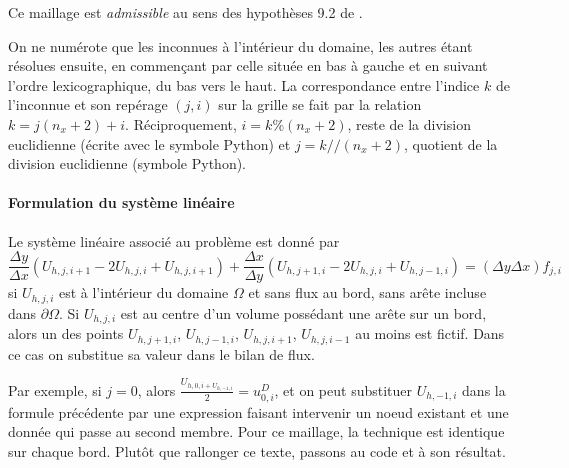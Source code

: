 \newpage

Ce maillage est \textit{admissible} au sens des hypothèses 9.2 de \cite{eymard:hal-02100732}. 

On ne numérote que les inconnues à l'intérieur du domaine, les autres étant résolues ensuite, en commençant par celle située en bas à gauche et en suivant l'ordre lexicographique, du bas vers le haut. La correspondance entre l'indice $k$ de l'inconnue et son repérage $(j,i)$ sur la grille se fait par la relation $k = j(n_x+2) + i$. Réciproquement, $i = k \% (n_x+2)$, reste de la division euclidienne (écrite avec le symbole Python) et $j = k // (n_x+2)$, quotient de la division euclidienne (symbole Python).

\paragraph{Formulation du système linéaire} Le système linéaire associé au problème est donné par
\begin{equation*}
    \frac{\Delta y}{\Delta x} \left( U_{h, j, i+1} - 2 U_{h, j, i} + U_{h, j, i+1} \right) + \frac{\Delta x}{\Delta y} \left( U_{h, j+1, i} - 2 U_{h, j, i} + U_{h, j-1, i} \right) = (\Delta y \Delta x) f_{j,i}
\end{equation*}
si $U_{h, j, i}$ est à l'intérieur du domaine $\Omega$ et sans flux au bord, sans arête incluse dans $\partial \Omega$. Si $U_{h, j, i}$ est au centre d'un volume possédant une arête sur un bord, alors un des points $U_{h, j+1, i}$, $U_{h, j-1, i}$, $U_{h, j, i+1}$, $U_{h, j, i-1}$ au moins est fictif. Dans ce cas on substitue sa valeur dans le bilan de flux. 

Par exemple, si $j=0$, alors $\frac{U_{h, 0, i + U_{h, -1, i}}}{2} = u^D_{0,i}$, et on peut substituer $U_{h, -1, i}$ dans la formule précédente par une expression faisant intervenir un noeud existant et une donnée qui passe au second membre. Pour ce maillage, la technique est identique sur chaque bord. Plutôt que rallonger ce texte, passons au code et à son résultat. 

